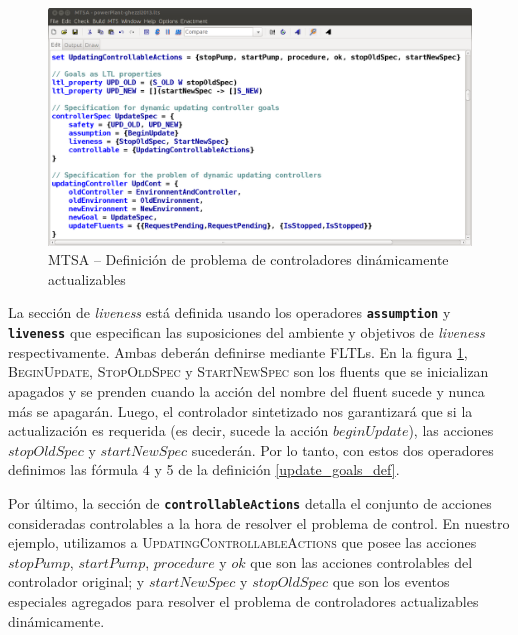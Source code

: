 \begin{figure}
    \centering
    \includegraphics[scale=0.35]{img/MTSA_example.png}
    \caption{MTSA -- Definición de problema de controladores dinámicamente actualizables}
    \label{MTSA_example}
\end{figure}

La sección de \emph{liveness} está definida usando los operadores \texttt{\textbf{assumption}} y
\texttt{\textbf{liveness}} que especifican las suposiciones del ambiente y objetivos de \emph{liveness} respectivamente.
Ambas deberán definirse mediante FLTLs. En la figura \ref{MTSA_example}, \textsc{BeginUpdate}, \textsc{StopOldSpec} y
\textsc{StartNewSpec} son los fluents que se inicializan apagados y se prenden cuando la acción del nombre del fluent
sucede y nunca más se apagarán. Luego, el controlador sintetizado nos garantizará que si la actualización es requerida
(es decir, sucede la acción $beginUpdate$), las acciones $stopOldSpec$ y $startNewSpec$ sucederán. Por lo tanto,
con estos dos operadores definimos las fórmula 4 y 5 de la definición \ref{update_goals_def}.

Por último, la sección de \texttt{\textbf{controllableActions}} detalla el conjunto de acciones consideradas
controlables a la hora de resolver el problema de control. En nuestro ejemplo, utilizamos a
\textsc{UpdatingControllableActions} que posee las acciones $stopPump$, $startPump$, $procedure$ y $ok$ que son las
acciones controlables del controlador original; y $startNewSpec$ y $stopOldSpec$ que son los eventos especiales
agregados para resolver el problema de controladores actualizables dinámicamente.




